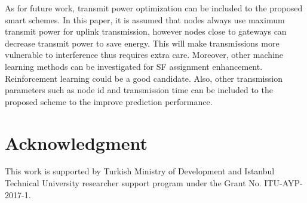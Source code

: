 \documentclass[conference]{IEEEtran}
\begin{document}
As for future work, transmit power optimization can be included to the proposed smart schemes. In this paper, it is assumed that nodes always use maximum transmit power for uplink transmission, however nodes close to gateways can decrease transmit power to save energy. This will make transmissions more vulnerable to interference thus requires extra care. Moreover, other machine learning methods can be investigated for SF assignment enhancement. Reinforcement learning could be a good candidate. Also, other transmission parameters such as node id and transmission time can be included to the proposed scheme to the improve prediction performance.


\section*{Acknowledgment}
This work is supported by Turkish Ministry of Development and Istanbul Technical University researcher support program under the Grant No. ITU-AYP-2017-1.




\end{document}
